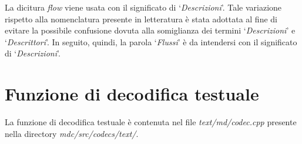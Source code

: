 \begin{notabene}
La dicitura \textit{flow} viene usata con il significato di
`\emph{Descrizioni}'. Tale variazione rispetto alla nomenclatura presente in
letteratura è stata adottata al fine di evitare la possibile confusione dovuta
alla somiglianza dei termini `\emph{Descrizioni}' e `\emph{Descrittori}'. In seguito, quindi, la parola `\emph{Flussi}' è da intendersi con il significato di `\emph{Descrizioni}'.
\end{notabene}

\section{Funzione di decodifica testuale}

La funzione di decodifica testuale è contenuta nel file
\textit{text/md/codec.cpp} presente nella directory
\textit{mdc/src/codecs/text/}.

